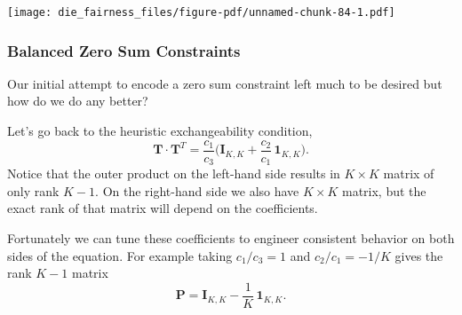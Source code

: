 \documentclass[
  letterpaper,
  DIV=11,
  numbers=noendperiod]{scrartcl}
\begin{document}
\texttt{[image: die\_fairness\_files/figure-pdf/unnamed-chunk-84-1.pdf]}

\subsubsection{Balanced Zero Sum
Constraints}\label{balanced-zero-sum-constraints}

Our initial attempt to encode a zero sum constraint left much to be
desired but how do we do any better?

Let's go back to the heuristic exchangeability condition, \[
\mathbf{T} \cdot \mathbf{T}^{T}
=
\frac{c_{1}}{c_{3}} \bigg( \mathbf{I}_{K, K}
+ \frac{c_{2}}{c_{1}} \, \mathbf{1}_{K, K} \bigg).
\] Notice that the outer product on the left-hand side results in
\(K \times K\) matrix of only rank \(K - 1\). On the right-hand side we
also have \(K \times K\) matrix, but the exact rank of that matrix will
depend on the coefficients.

Fortunately we can tune these coefficients to engineer consistent
behavior on both sides of the equation. For example taking
\(c_{1} / c_{3} = 1\) and \(c_{2} / c_{1} = - 1 / K\) gives the rank
\(K - 1\) matrix \[
\mathbf{P}
=
\mathbf{I}_{K, K} - \frac{1}{K} \, \mathbf{1}_{K, K}.
\]
\end{document}
